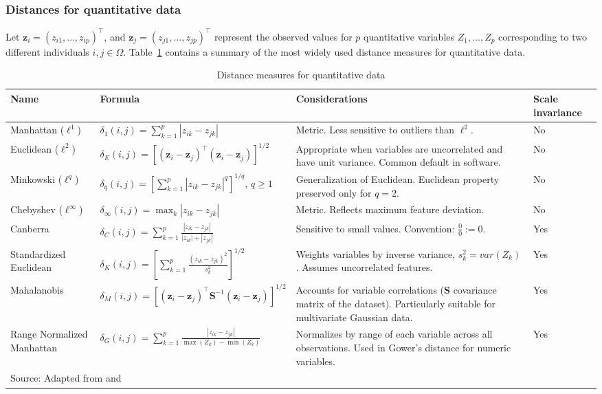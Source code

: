 \subsubsection{Distances for quantitative data}

Let $\mathbf{z}_{i} = (z_{i1}, \dots, z_{ip})^{\top}$, and $\mathbf{z}_{j} = (z_{j1}, \dots, z_{jp})^{\top}$ represent the observed values for $p$ quantitative variables $Z_1, \dots, Z_p$ corresponding to two different individuals $i,j \in \Omega$. Table~\ref{tab.dist.numerical} contains a summary of the most widely used distance measures for quantitative data.

\begin{table}[h!]
\begin{center}
\caption{Distance measures for quantitative data}
\label{tab.dist.numerical}
{\footnotesize
\begin{tabular}{|p{2cm}p{4.7cm}p{5cm}p{1cm}|}
\hline
\textbf{Name} & \textbf{Formula} & \textbf{Considerations} & \textbf{Scale invariance}\\
\hline
Manhattan ($\ell^1$) & 
$ \delta_1(i,j) = \sum_{k=1}^{p} |z_{ik} - z_{jk}| $ & 
Metric. Less sensitive to outliers than $\ell^2$. & No \\
\hline
Euclidean ($\ell^2$) & 
$ \delta_E(i,j) = \left[  (\mathbf{z}_i - \mathbf{z}_j)^{\top}(\mathbf{z}_i - \mathbf{z}_j) \right]^{1/2} $ & 
Appropriate when variables are uncorrelated and have unit variance. Common default in software. & No \\
\hline
Minkowski ($\ell^q$) & 
$ \delta_q(i,j) = \left[ \sum_{k=1}^{p} |z_{ik} - z_{jk}|^q \right]^{1/q}$,  $q \ge 1 $ & 
Generalization of Euclidean. Euclidean property preserved only for $q = 2$. & No \\
\hline
Chebyshev ($\ell^\infty$) & 
$ \delta_\infty(i,j) = \max_k |z_{ik} - z_{jk}| $ & 
Metric. Reflects maximum feature deviation. & No \\
\hline
Canberra & 
$ \delta_C(i,j) = \sum_{k=1}^{p} \frac{|z_{ik} - z_{jk}|}{|z_{ik}| + |z_{jk}|} $ & 
Sensitive to small values. Convention: $\frac{0}{0} := 0$. & Yes \\
\hline
Standardized Euclidean & 
$ \delta_K(i,j) = \left[ \sum_{k=1}^{p} \frac{(z_{ik} - z_{jk})^2}{s_k^2} \right]^{1/2} $ & 
Weights variables by inverse variance, $s_{k}^2=var(Z_k)$. Assumes uncorrelated features. & Yes \\
\hline
Mahalanobis & 
$ \delta_M(i,j) = \left[ (\mathbf{z}_i - \mathbf{z}_j)^{\top} \mathbf{S}^{-1}(\mathbf{z}_i - \mathbf{z}_j) \right]^{1/2} $ & 
Accounts for variable correlations ($\mathbf{S}$ covariance matrix of the dataset). Particularly suitable for multivariate Gaussian data. & Yes \\
\hline
Range Normalized Manhattan %
& 
$ \delta_G(i,j) = \sum_{k=1}^{p} \frac{|z_{ik} - z_{jk}|}{\max(Z_k) - \min(Z_k)} $ & 
Normalizes by range of each variable across all observations. Used in Gower’s distance for numeric variables. & Yes \\
\hline
\multicolumn{3}{l}{Source: Adapted from \cite{gower1986metric} and \cite{CUADRAS1989459}}
\end{tabular}}
\end{center}
\end{table}

